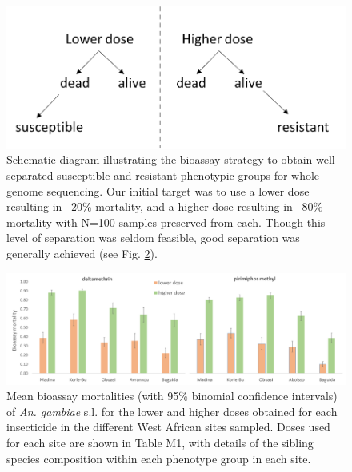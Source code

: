 \documentclass[a4paper,12pt]{article}
\begin{document}
\begin{figure}[h]
	\begin{center}
		\includegraphics*[width = 5in]{figures/bioassay_design.png}
	\end{center}
	\caption{\footnotesize Schematic diagram illustrating the bioassay strategy to obtain well-separated susceptible and resistant phenotypic groups for whole genome sequencing. Our initial target was to use a lower dose resulting in ~20\% mortality, and a higher dose resulting in ~80\% mortality with N=100 samples preserved from each. Though this level of separation was seldom feasible, good separation was generally achieved (see Fig. \ref{FigM2}).}
	\label{FigM1}
\end{figure}

\begin{figure}[h]
	\begin{center}
		\includegraphics*[width = 6in]{figures/bioassay_results.png}
	\end{center}
	\caption{\footnotesize Mean bioassay mortalities (with 95\% binomial confidence intervals) of \textit{An. gambiae} s.l. for the lower and higher doses obtained for each insecticide in the different West African sites sampled. Doses used for each site are shown in Table M1, with details of the sibling species composition within each phenotype group in each site.}
	\label{FigM2}
\end{figure}

\vskip 1cm
\end{document}
